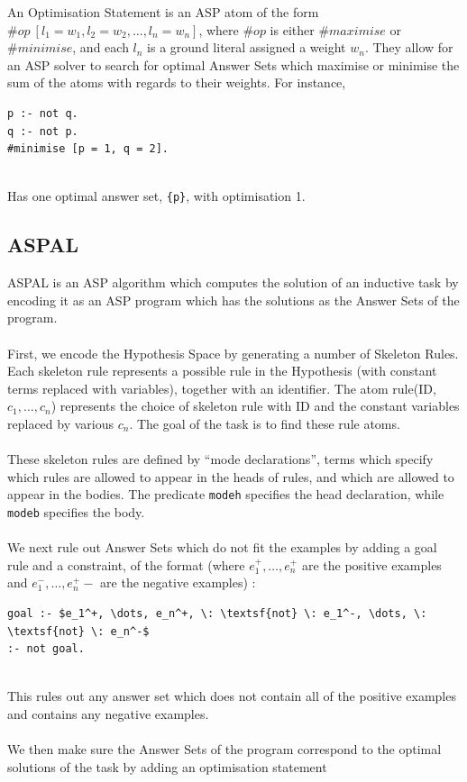An Optimisation Statement \cite{Eiter2008} is an ASP atom of the form $ \#op \: [l_1 = w_1, l_2 = w_2, \dots, l_n = w_n]$, where $\#op$ is either $\#maximise$ or $\#minimise$, and each $l_n$ is a ground literal assigned a weight $w_n$. They allow for an ASP solver to search for optimal Answer Sets which maximise or minimise the sum of the atoms with regards to their weights. For instance, \\

\begin{lstlisting}
p :- not q.
q :- not p.
#minimise [p = 1, q = 2].
\end{lstlisting}
\mbox{}\\
Has one optimal answer set, \lstinline!{p}!, with optimisation 1.

\subsection{ASPAL}

ASPAL \cite{Corapi2012} is an ASP algorithm which computes the solution of an inductive task by encoding it as an ASP program which has the solutions as the Answer Sets of the program.\\ \\
First, we encode the Hypothesis Space by generating a number of Skeleton Rules. Each skeleton rule represents a possible rule in the Hypothesis (with constant terms replaced with variables), together with an identifier. The atom rule(ID, $c_1, \dots, c_n$) represents the choice of skeleton rule with ID and the constant variables replaced by various $c_n$. The goal of the task is to find these rule atoms.\\ \\
These skeleton rules are defined by ``mode declarations'', terms which specify which rules are allowed to appear in the heads of rules, and which are allowed to appear in the bodies. The predicate \lstinline!modeh! specifies the head declaration, while \lstinline!modeb! specifies the body. \\ \\
We next rule out Answer Sets which do not fit the examples by adding a goal rule and a constraint, of the format (where $e_1^+, \dots, e_n^+$ are the positive examples and $e_1^-, \dots, e_n^+-$ are the negative examples) : \\

\begin{lstlisting}[mathescape=true]
goal :- $e_1^+, \dots, e_n^+, \: \textsf{not} \: e_1^-, \dots, \: \textsf{not} \: e_n^-$
:- not goal.
\end{lstlisting}
\mbox{}\\
This rules out any answer set which does not contain all of the positive examples and contains any negative examples. \\ \\
We then make sure the Answer Sets of the program correspond to the optimal solutions of the task by adding an optimisation statement \\

